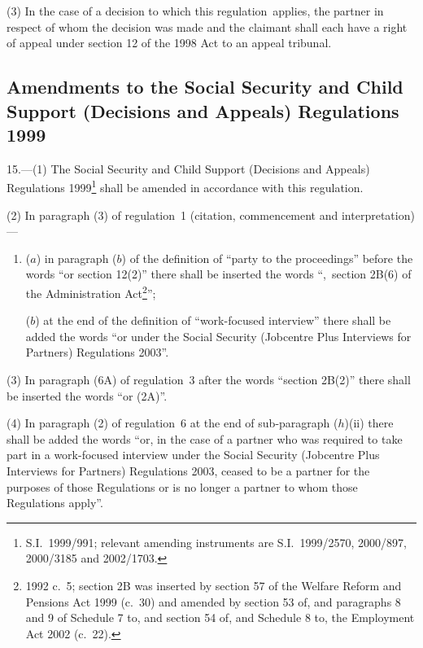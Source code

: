\documentclass[12pt,a4paper]{article}
\begin{document}
(3) In the case of a decision to which this regulation~applies, the partner in respect of whom the decision was made and the claimant shall each have a right of appeal under section 12 of the 1998 Act to an appeal tribunal.

\subsection[15. Amendments to the Social Security and Child Support (Decisions and Appeals) Regulations 1999]{Amendments to the Social Security and Child Support (Decisions and Appeals) Regulations 1999}

15.---(1)  The Social Security and Child Support (Decisions and Appeals) Regulations 1999\footnote{S.I.~1999/991; relevant amending instruments are S.I.~1999/2570, 2000/897, 2000/3185 and 2002/1703.} shall be amended in accordance with this regulation.

(2) In paragraph (3) of regulation~1 (citation, commencement and interpretation)—
\begin{enumerate}\item[]
($a$) in paragraph ($b$)  of the definition of “party to the proceedings” before the words “or section 12(2)” there shall be inserted the words “,~section 2B(6) of the Administration Act\footnote{1992 c.~5; section 2B was inserted by section 57 of the Welfare Reform and Pensions Act 1999 (c.~30) and amended by section 53 of, and paragraphs 8 and 9 of Schedule 7 to, and section 54 of, and Schedule 8 to, the Employment Act 2002 (c.~22).}”;

($b$) at the end of the definition of “work-focused interview” there shall be added the words “or under the Social Security (Jobcentre Plus Interviews for Partners) Regulations 2003”.
\end{enumerate}

(3) In paragraph (6A) of regulation~3 after the words “section 2B(2)” there shall be inserted the words “or (2A)”.

(4) In paragraph (2) of regulation~6 at the end of sub-paragraph ($h$)(ii)  there shall be added the words “or, in the case of a partner who was required to take part in a work-focused interview under the Social Security (Jobcentre Plus Interviews for Partners) Regulations 2003, ceased to be a partner for the purposes of those Regulations or is no longer a partner to whom those Regulations apply”.
\end{document}
